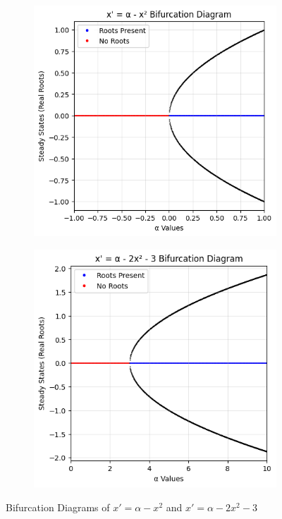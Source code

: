 \begin{figure}[H]
    \centering
    \begin{subfigure}[b]{0.45\textwidth}
        \centering
        \includegraphics[width=\textwidth]{images/task2eq6.png}
        \label{fig:subfig1}
    \end{subfigure}
    \hfill
    \begin{subfigure}[b]{0.45\textwidth}
        \centering
        \includegraphics[width=\textwidth]{images/task2eq7.png}
        \label{fig:subfig2}
    \end{subfigure}
    \caption{Bifurcation Diagrams of $x' = \alpha - x^2$ and $x' = \alpha - 2x^2 - 3$}
    \label{fig:task2}
\end{figure}


